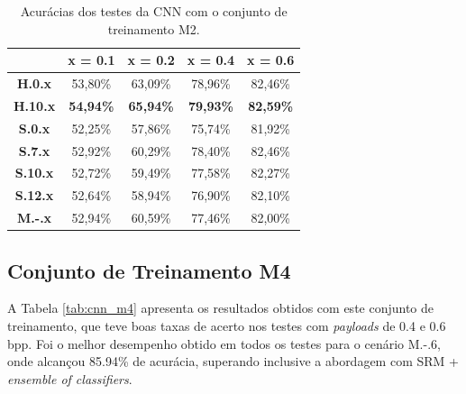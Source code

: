 \begin{table}[!htb]
\centering
\begin{tabular}{c|c|c|c|c|}
\cline{2-5}
\textbf{}                             & \textbf{x = 0.1} & \textbf{x = 0.2} & \textbf{x = 0.4} & \textbf{x = 0.6} \\ \hline
\multicolumn{1}{|c|}{\textbf{H.0.x}}  & 53,80\%          & 63,09\%          & 78,96\%          & 82,46\%          \\ \hline
\multicolumn{1}{|c|}{\textbf{H.10.x}} & \textbf{54,94\%} & \textbf{65,94\%} & \textbf{79,93\%} & \textbf{82,59\%} \\ \hline
\multicolumn{1}{|c|}{\textbf{S.0.x}}  & 52,25\%          & 57,86\%          & 75,74\%          & 81,92\%          \\ \hline
\multicolumn{1}{|c|}{\textbf{S.7.x}}  & 52,92\%          & 60,29\%          & 78,40\%          & 82,46\%          \\ \hline
\multicolumn{1}{|c|}{\textbf{S.10.x}} & 52,72\%          & 59,49\%          & 77,58\%          & 82,27\%          \\ \hline
\multicolumn{1}{|c|}{\textbf{S.12.x}} & 52,64\%          & 58,94\%          & 76,90\%          & 82,10\%          \\ \hline
\multicolumn{1}{|c|}{\textbf{M.-.x}}  & 52,94\%          & 60,59\%          & 77,46\%          & 82,00\%          \\ \hline
\end{tabular}
\caption{Acurácias dos testes da CNN com o conjunto de treinamento M2.}
\label{tab:cnn_m2}
\end{table}


\subsection{Conjunto de Treinamento M4}

A Tabela \ref{tab:cnn_m4} apresenta os resultados obtidos com este conjunto de treinamento, que teve boas taxas de acerto nos testes com \textit{payloads} de 0.4 e 0.6 bpp. Foi o melhor desempenho obtido em todos os testes para o cenário M.-.6, onde alcançou 85.94\% de acurácia, superando inclusive a abordagem com SRM + \textit{ensemble of classifiers}.

